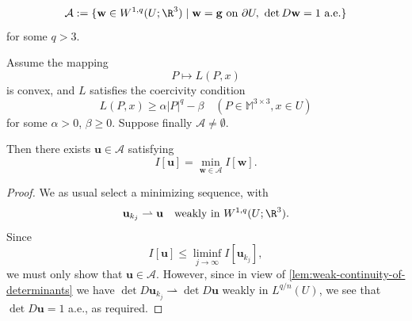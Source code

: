 \begin{definition}
\label{def:admissible-class-incompressible-elasticity}
\[
\mathcal{A} := \{\mathbf{w} \in W^{1,q}(U; \R^3) \mid \mathbf{w} = \mathbf{g} \text{ on } \partial U,\ \det D\mathbf{w} = 1 \text{ a.e.}\}
\]
for some $q > 3$.
\end{definition}

\begin{theorem}
\label{thm:existence-minimizer-determinant-constraint}
Assume the mapping
\[
P \mapsto L(P,x)
\]
is convex, and $L$ satisfies the coercivity condition
\[
L(P,x) \geq \alpha|P|^q - \beta \quad (P \in \mathbb{M}^{3 \times 3}, x \in U)
\]
for some $\alpha > 0$, $\beta \geq 0$. Suppose finally $\mathcal{A} \neq \emptyset$.

Then there exists $\mathbf{u} \in \mathcal{A}$ satisfying
\[
I[\mathbf{u}] = \min_{\mathbf{w} \in \mathcal{A}} I[\mathbf{w}].
\]
\end{theorem}
\begin{proof}
We as usual select a minimizing sequence, with
\[
\mathbf{u}_{k_j} \rightharpoonup \mathbf{u} \quad \text{weakly in } W^{1,q}(U; \R^3).
\]
Since
\[
I[\mathbf{u}] \leq \liminf_{j \to \infty} I[\mathbf{u}_{k_j}],
\]
we must only show that $\mathbf{u} \in \mathcal{A}$. However, since in view of \cref{lem:weak-continuity-of-determinants} we have $\det D\mathbf{u}_{k_j} \rightharpoonup \det D\mathbf{u}$ weakly in $L^{q/n}(U)$, we see that $\det D\mathbf{u} = 1$ a.e., as required.
\end{proof}

